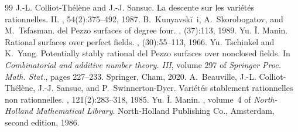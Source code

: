 \documentclass[10pt,a4paper]{amsart}
\begin{document}
\begin{thebibliography}{99}
 J.-L. Colliot-Th\'{e}l\`ene and J.-J. Sansuc. \newblock La descente sur les vari\'{e}t\'{e}s rationnelles. {II}. , 54(2):375--492, 1987.
 B.~Kunyavski\u~i, A.~Skorobogatov, and M.~Tsfasman. \newblock del {P}ezzo surfaces of degree four. , (37):113, 1989.
 Yu. \~I. Manin. \newblock Rational surfaces over perfect fields. , (30):55--113, 1966.
 Yu. Tschinkel and K.~Yang. \newblock Potentially stably rational del {P}ezzo surfaces over nonclosed fields. \newblock In {\em Combinatorial and additive number theory. {III}}, volume 297 of {\em Springer Proc. Math. Stat.}, pages 227--233. Springer, Cham, 2020.
 A.~Beauville, J.-L. Colliot-Th\'el\`ene, J.-J. Sansuc, and P.~Swinnerton-Dyer. \newblock Vari\'et\'es stablement rationnelles non rationnelles. , 121(2):283--318, 1985.
 Yu. \~I. Manin. , volume~4 of {\em North-Holland Mathematical Library}. \newblock North-Holland Publishing Co., Amsterdam, second edition, 1986.
\end{thebibliography}
\end{document}

